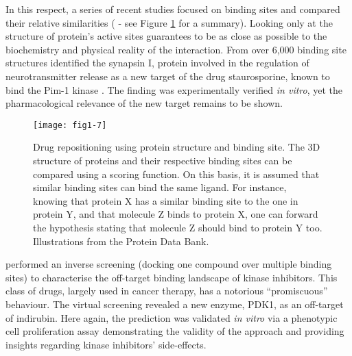 In this respect, a series of recent studies focused on binding sites and compared their relative similarities (\cite{haupt2011old} - see Figure \ref{fig1-7} for a summary). Looking only at the structure of protein's active sites guarantees to be as close as possible to the biochemistry and physical reality of the interaction. From over 6,000 binding site structures \cite{de2010binding} identified the synapsin I, protein involved in the regulation of neurotransmitter release as a new target of the drug staurosporine, known to bind the Pim-1 kinase \citep{de2010binding}. The finding was experimentally verified \emph{in vitro}, yet the pharmacological relevance of the new target remains to be shown.

\begin{figure}[ht]
    \centering
    \texttt{[image: fig1-7]}
    \caption{Drug repositioning using protein structure and binding site. The 3D structure of proteins and their respective binding sites can be compared using a scoring function. On this basis, it is assumed that similar binding sites can bind the same ligand. For instance, knowing that protein X has a similar binding site to the one in protein Y, and that molecule Z binds to protein X, one can forward the hypothesis stating that molecule Z should bind to protein Y too. Illustrations from the Protein Data Bank.}
    \label{fig1-7}
\end{figure}

\cite{zahler2007inverse} performed an inverse screening (docking one compound over multiple binding sites) to characterise the off-target binding landscape of kinase inhibitors. This class of drugs, largely used in cancer therapy, has a notorious ``promiscuous'' behaviour. The virtual screening revealed a new enzyme, PDK1, as an off-target of indirubin. Here again, the prediction was validated \emph{in vitro} via a phenotypic cell proliferation assay demonstrating the validity of the approach and providing insights regarding kinase inhibitors' side-effects.


